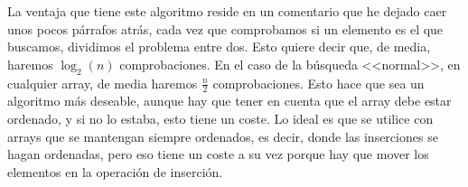\documentclass[a4paper]{article}
\begin{document}
La ventaja que tiene este algoritmo reside en un comentario que he dejado caer
unos pocos párrafos atrás, cada vez que comprobamos si un elemento es el que
buscamos, dividimos el problema entre dos. Esto quiere decir que, de media,
haremos $\log_{2}{\left(n\right)}$ comprobaciones. En el caso de la búsqueda <<normal>>, en
cualquier array, de media haremos $\frac{n}{2}$ comprobaciones. Esto hace que
sea un algoritmo más deseable, aunque hay que tener en cuenta que el array
debe estar ordenado, y si no lo estaba, esto tiene un coste. Lo ideal es
que se utilice con arrays que se mantengan siempre ordenados, es decir, donde
las inserciones se hagan ordenadas, pero eso tiene un coste a su vez porque
hay que mover los elementos en la operación de inserción.

%
%
\end{document}
